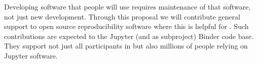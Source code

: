 \begin{task}[
  title=Maintenance of open source reproducibility software,
  id=maintenance,
  lead=SRL,
  PM=6,
  partners={QS}
]

Developing software that people will use requires maintenance of that
software, not just new development. Through  this proposal we will
contribute general support to open source reproducibility software
where this is helpful for \TheProject. Such contributions are expected 
to the Jupyter (and as subproject) Binder code base. They support not
just all participants in \TheProject but also millions of people
relying on Jupyter software.


% 
% 
% 
% 

\end{task}
